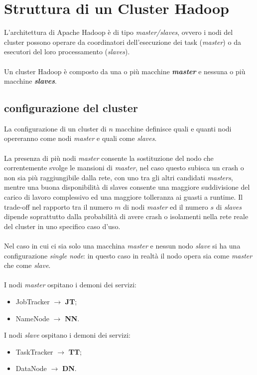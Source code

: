 \documentclass[a4paper,11pt]{report}
\begin{document}
\section{Struttura di un Cluster Hadoop}
L'architettura di Apache Hadoop è di tipo \emph{master/slaves}, ovvero i nodi del cluster possono operare da coordinatori dell'esecuzione
dei task (\emph{master}) o da
esecutori del loro processamento (\emph{slaves}). 
\paragraph{}
Un cluster Hadoop è composto da una o più macchine \emph{\textbf{master}} e nessuna o più macchine \emph{\textbf{slaves}}.
\subsection{configurazione del cluster}
La configurazione di un cluster di $n$ macchine definisce quali e quanti nodi opereranno come nodi \emph{master} e quali come \emph{slaves}.
\paragraph{}
La presenza di più nodi \emph{master} consente la sostituzione del nodo che correntemente svolge le mansioni di \emph{master}, nel caso
questo subisca un crash
o non sia più raggiungibile dalla rete, con uno tra gli altri candidati \emph{masters}, mentre una buona disponibilità di slaves consente
una maggiore suddivisione del carico 
di lavoro complessivo ed una maggiore tolleranza ai guasti a runtime. Il trade-off nel rapporto tra il numero $m$ di nodi \emph{master} ed
il numero $s$ di \emph{slaves}
dipende soprattutto dalla probabilità di avere crash o isolamenti nella rete reale del cluster in uno specifico caso d'uso.
\paragraph{}
Nel caso in cui ci sia solo una macchina \emph{master} e nessun nodo \emph{slave} si ha una configurazione \emph{single node}: in questo
caso 
in realtà il nodo opera sia come \emph{master} che come \emph{slave}.
\paragraph{}
I nodi \emph{master} ospitano i demoni dei servizi:
\begin{itemize}
 \item JobTracker $\rightarrow$ \textbf{JT};
 \item NameNode $\rightarrow$ \textbf{NN}.
\end{itemize}
I nodi \emph{slave} ospitano i demoni dei servizi:
\begin{itemize}
 \item TaskTracker $\rightarrow$ \textbf{TT};
  \item DataNode $\rightarrow$ \textbf{DN}.
\end{itemize}
\end{document}
